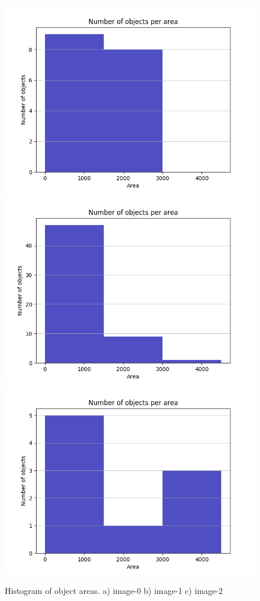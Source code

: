 \documentclass[]{IEEEtran}
\begin{document}
\begin{figure}[]
  \centering
  \includegraphics[width=0.8\hsize]{../output/image-0-histogram.png}
  \includegraphics[width=0.8\hsize]{../output/image-1-histogram.png}
  \includegraphics[width=0.8\hsize]{../output/image-2-histogram.png}
  \caption{Histogram of object areas. a) image-0 b) image-1 c) image-2}
  \label{fig:hist}
\end{figure}
\end{document}
